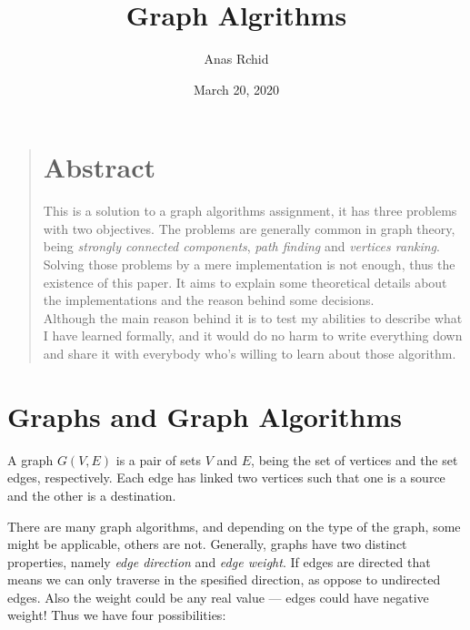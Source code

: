 \documentclass[12pt]{article}
\title{Graph Algrithms}
\author{Anas Rchid}
\date{March 20, 2020}
\begin{document}
\maketitle
\vspace*{\fill}
\begin{quotation}
  \begin{center}
    \section*{Abstract}
  \end{center}
  This is a solution to a graph algorithms assignment, it has three problems with two objectives. The problems are generally common in graph theory, being \textit{strongly connected components}, \textit{path finding} and \textit{vertices ranking}. Solving those problems by a mere implementation is not enough, thus the existence of this paper. It aims to explain some theoretical details about the implementations and the reason behind some decisions. \\

  Although the main reason behind it is to test my abilities to describe what I have learned formally, and it would do no harm to write everything down and share it with everybody who's willing to learn about those algorithm.
\end{quotation}
\vspace*{\fill}
\clearpage

\tableofcontents
\vspace*{\fill}
\listofalgorithms
\vspace*{\fill}
\clearpage

\section{Graphs and Graph Algorithms}

A graph $G(V,E)$ is a pair of sets $V$ and $E$, being the set of vertices and the set edges, respectively. Each edge has linked two vertices such that one is a source and the other is a destination.

There are many graph algorithms, and depending on the type of the graph, some might be applicable, others are not.  Generally, graphs have two distinct properties, namely \textit{edge direction} and \textit{edge weight}. If edges are directed that means we can only traverse in the spesified direction, as oppose to undirected edges. Also the weight could be any real value --- edges could have negative weight! Thus we have four possibilities:
\end{document}
